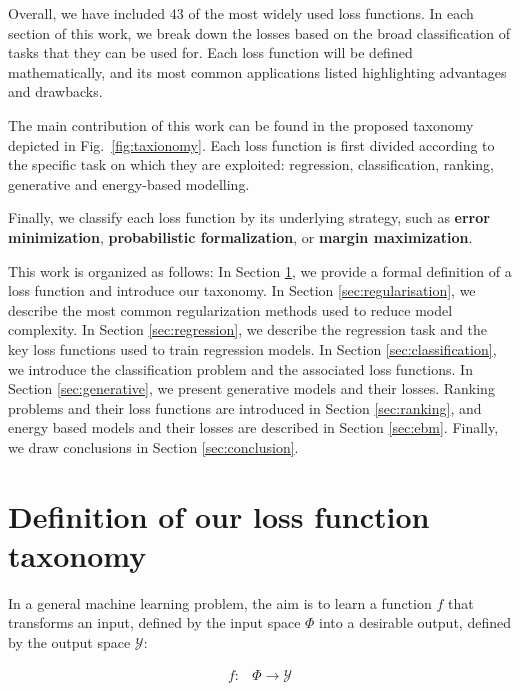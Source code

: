 \documentclass[sn-mathphys-num]{sn-jnl}%
\begin{document}
    Overall, we have included 43 of the most widely used loss functions. In each section of this work, we break down the losses based on the broad classification of tasks that they can be used for. Each loss function will be defined mathematically, and its most common applications listed highlighting advantages and drawbacks. 
    
    The main contribution of this work can be found in the proposed taxonomy depicted in Fig.~\ref{fig:taxionomy}. Each loss function is first divided according to the specific task on which they are exploited: regression, classification, ranking, generative and energy-based modelling.
  
    Finally, we classify each loss function by its underlying strategy, such as \textbf{error minimization}, \textbf{probabilistic formalization}, or \textbf{margin maximization}.

        
    \bigskip
     This work is organized as follows: In Section \ref{sec:definition}, we provide a formal definition of a loss function and introduce our taxonomy. In Section \ref{sec:regularisation}, we describe the most common regularization methods used to reduce model complexity. In Section \ref{sec:regression}, we describe the regression task and the key loss functions used to train regression models. In Section \ref{sec:classification}, we introduce the classification problem and the associated loss functions. In Section \ref{sec:generative}, we present generative models and their losses. Ranking problems and their loss functions are introduced in Section \ref{sec:ranking}, and energy based models and their losses are described in Section \ref{sec:ebm}. Finally, we draw conclusions in Section \ref{sec:conclusion}.
    
       
    


\section{Definition of our loss function taxonomy} \label{sec:definition}

    In a general machine learning problem, the aim is to learn a function $f$ that transforms an input, defined by the input space $\Phi$ into a desirable output, defined by the output space $\mathcal{Y}$:
    
    \begin{align*}
        f \colon &\Phi \to \mathcal{Y}
    \end{align*}
    
\end{document}
